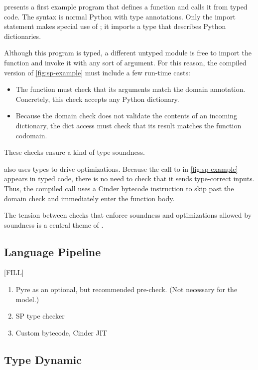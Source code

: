 \documentclass[a4paper,english,cleveref,autoref,thm-restate,anonymous,]{lipics-v2021}
\begin{document}
 presents a first example program
that defines a function  and calls it from typed code.
The syntax is normal Python with type annotations.
Only the import statement makes special use of \SP{};
it imports a type  that describes Python dictionaries.

Although this program is typed, a different untyped module is free
to import the function  and invoke it with any sort of
argument.
For this reason, the compiled version of \cref{fig:sp-example} must
include a few run-time casts:
\begin{itemize}
  \item
    The function  must check that its arguments match the  domain annotation.
    Concretely, this check accepts any Python dictionary.
  \item
    Because the domain check does not validate the contents of an incoming dictionary,
    the dict access must check that its result matches the function codomain.
\end{itemize}
These checks ensure a kind of type soundness.

\SP{} also uses types to drive optimizations.
Because the call to  in \cref{fig:sp-example} appears in typed code,
there is no need to check that it sends type-correct inputs.
Thus, the compiled call uses a Cinder bytecode instruction to skip past the
domain check and immediately enter the function body.

The tension between checks that enforce soundness and optimizations allowed by soundness
is a central theme of \SP{}.


\subsection{Language Pipeline}

[FILL]

\begin{enumerate}
  \item Pyre as an optional, but recommended pre-check. (Not necessary for the model.)
  \item SP type checker
  \item Custom bytecode, Cinder JIT
\end{enumerate}


\subsection{Type Dynamic}
\end{document}

